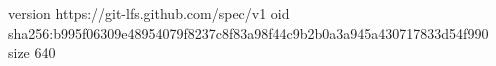 version https://git-lfs.github.com/spec/v1
oid sha256:b995f06309e48954079f8237c8f83a98f44c9b2b0a3a945a430717833d54f990
size 640
